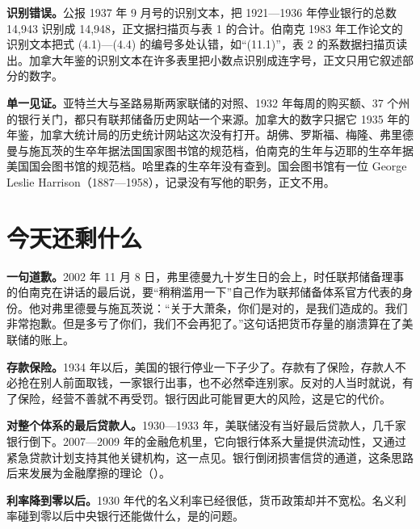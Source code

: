 \begin{deeper}[史料说明]
\textbf{识别错误。}公报 1937 年 9 月号的识别文本，把 1921—1936 年停业银行的总数 14,943 识别成 14,948，正文据扫描页与表 1 的合计。伯南克 1983 年工作论文的识别文本把式 (4.1)—(4.4) 的编号多处认错，如“(11.1)”，表 2 的系数据扫描页读出。加拿大年鉴的识别文本在许多表里把小数点识别成连字号，正文只用它叙述部分的数字。

\textbf{单一见证。}亚特兰大与圣路易斯两家联储的对照、1932 年每周的购买额、37 个州的银行关门，都只有联邦储备历史网站一个来源。加拿大的数字只据它 1935 年的年鉴，加拿大统计局的历史统计网站这次没有打开。胡佛、罗斯福、梅隆、弗里德曼与施瓦茨的生卒年据法国国家图书馆的规范档，伯南克的生年与迈耶的生卒年据美国国会图书馆的规范档。哈里森的生卒年没有查到。国会图书馆有一位 George Leslie Harrison（1887—1958），记录没有写他的职务，正文不用。
\end{deeper}

\section{今天还剩什么}\label{sec:depressionus-legacy}

\textbf{一句道歉。}2002 年 11 月 8 日，弗里德曼九十岁生日的会上，时任联邦储备理事的伯南克在讲话的最后说，要“稍稍滥用一下”自己作为联邦储备体系官方代表的身份。他对弗里德曼与施瓦茨说：“关于大萧条，你们是对的，是我们造成的。我们非常抱歉。但是多亏了你们，我们不会再犯了。”\cite{bernanke2002}这句话把货币存量的崩溃算在了美联储的账上。

\textbf{存款保险。}1934 年以后，美国的银行停业一下子少了。存款有了保险，存款人不必抢在别人前面取钱，一家银行出事，也不必然牵连别家。反对的人当时就说，有了保险，经营不善就不再受罚\cite{fdic1998}。银行因此可能冒更大的风险，这是它的代价。

\textbf{对整个体系的最后贷款人。}1930—1933 年，美联储没有当好最后贷款人，几千家银行倒下\cite{frhgd}。2007—2009 年的金融危机里，它向银行体系大量提供流动性，又通过紧急贷款计划支持其他关键机构，这一点见\cite{frhpanic2}。银行倒闭损害信贷的通道，这条思路后来发展为金融摩擦的理论（）。

\textbf{利率降到零以后。}1930 年代的名义利率已经很低，货币政策却并不宽松。名义利率碰到零以后中央银行还能做什么，是的问题。

